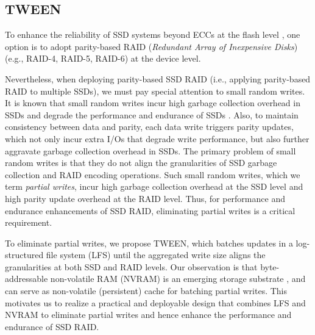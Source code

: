 \subsection{TWEEN}


To enhance the reliability of SSD systems beyond ECCs at the flash
level \cite{mielke08,grupp09,grupp12}, one option is to adopt 
parity-based RAID (\textit{Redundant Array of Inexpensive Disks})
\cite{patterson88} (e.g., RAID-4, RAID-5, RAID-6) at the device level. 

Nevertheless, when deploying parity-based SSD RAID (i.e., applying
parity-based RAID to multiple SSDs), we must pay special attention to small
random writes.  It is known that small random writes incur high garbage
collection overhead in SSDs and degrade the performance and endurance of SSDs
\cite{kim08,chen09,min12}.  Also, to maintain consistency between data and
parity, each data write triggers parity updates, which not only incur extra
I/Os that degrade write performance, but also further aggravate garbage
collection overhead in SSDs.  The primary problem of small random writes is
that they do not align the granularities of SSD garbage collection and RAID
encoding operations.  Such small random writes, which we term 
{\em partial writes}, incur high garbage collection overhead at the SSD level
and high parity update overhead at the RAID level.  Thus, for performance and
endurance enhancements of SSD RAID, eliminating partial writes is a critical
requirement. 

To eliminate partial writes, we propose TWEEN, which batches updates in a
log-structured file system (LFS) \cite{rosenblum92} until the aggregated write
size aligns the granularities at both SSD and RAID levels.  Our observation is
that byte-addressable non-volatile RAM (NVRAM) is an emerging storage substrate
\cite{jung10,venkataraman11,zhou09,qiu13,lee14}, and can serve as non-volatile
(persistent) cache for batching partial writes. This motivates us to realize a
practical and deployable design that combines LFS and NVRAM to eliminate partial
writes and hence enhance the performance and endurance of SSD RAID. 

